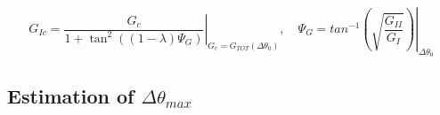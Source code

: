\documentclass[first,firstsupp,lastsupp,last,hyperref,table]{ETHclass}
\begin{document}
\begin{frame}
\begin{columns}[c]
\begin{column}{0.5\textwidth}
\begin{figure}
\end{figure}
\end{column}
\end{columns}
\vspace{-0.2cm}
\scriptsize
\begin{equation*}
G_{Ic}=\left.\frac{G_{c}}{1+\tan^{2}\left(\left(1-\lambda\right)\Psi_{G}\right)}\right|_{G_{c}=G_{TOT}\left(\Delta\theta_{0}\right)},\quad\Psi_{G}=\left.tan^{-1}\left(\sqrt{\frac{G_{II}}{G_{I}}}\right)\right|_{\Delta\theta_{0}}
\end{equation*}
\end{frame}

\subsection{Estimation of $\Delta\theta_{max}$}
\end{document}
